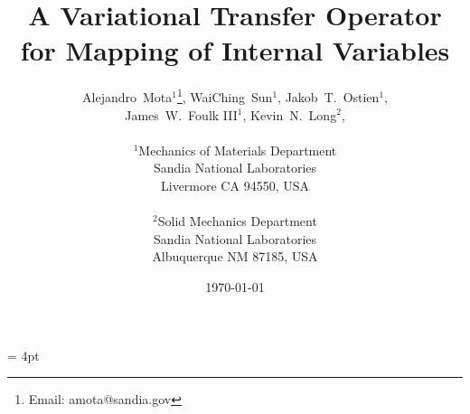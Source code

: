\documentclass[12pt]{article}
\begin{document}
\setlength{\headheight}{15pt}
\headsep = 4pt
\pagestyle{fancyplain}


\rfoot
[\fancyplain{}{\bf{\today}}]
{\fancyplain{}{\bf{\today}}}



\title{A Variational Transfer Operator for Mapping of Internal
Variables}

\author{
  \Large
  Alejandro~Mota$^1$\thanks{Email: amota@sandia.gov},
  WaiChing~Sun$^1$,
  Jakob~T.~Ostien$^1$,
  \\
  \Large
  James~W.~Foulk {III}$^1$,
  Kevin~N.~Long$^2$,
  \\
  \\
  $^1$Mechanics of Materials Department\\
  Sandia National Laboratories\\
  Livermore CA 94550, USA\\
  \\
  $^2$Solid Mechanics Department\\
  Sandia National Laboratories\\
  Albuquerque NM 87185, USA\\
}

\date{\today}

\maketitle
\end{document}
